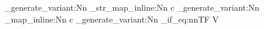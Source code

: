%

%
%
%
%
%


\usepackage{expl3}
\usepackage{xparse}
\usepackage{forloop}
\usepackage{siunitx}

\ExplSyntaxOn
\cs_generate_variant:Nn \ior_str_map_inline:Nn { c } 
\cs_generate_variant:Nn \ior_map_inline:Nn { c }
\cs_generate_variant:Nn \tl_if_eq:nnTF { V }

